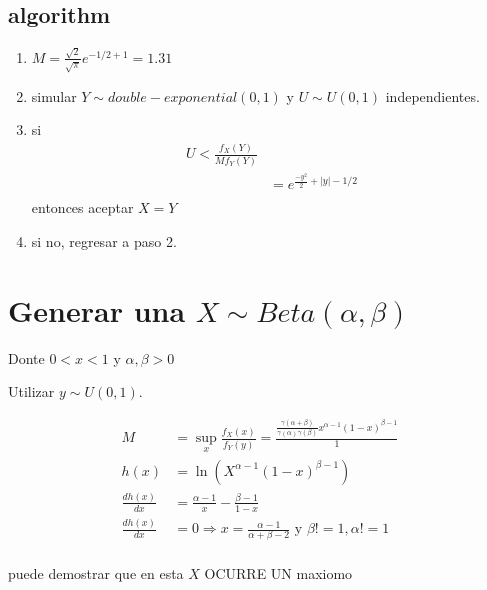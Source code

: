 \documentclass[10pt, oneside]{article}
\begin{document}
\subsection{algorithm}

\begin{enumerate}
	\item $M = \frac{\sqrt{2}}{\sqrt{\pi}} e^{-1/2 + 1} = 1.31$
	\item simular $Y \sim double-exponential(0,1)$ y $U \sim U(0,1)$ independientes.
	\item si
	      \[
		      \begin{split}
			      U < \frac{f_X(Y)}{M f_Y(Y)}         \\
			       & = e^{\frac{-y^2}{2} + |y| - 1/2} \\
		      \end{split}
	      \]
	      entonces aceptar $X = Y$
	\item si no, regresar a paso 2.
\end{enumerate}


\section{Generar una $X \sim Beta(\alpha,\beta)$}

Donte $0 < x < 1$ y $\alpha, \beta > 0$

Utilizar $y \sim U(0,1)$.

\[
	\begin{split}
		M                 & = \sup_x \frac{f_X(x)}{f_Y(y)} = \frac{\frac{\gamma(\alpha + \beta)}{\gamma(\alpha)\gamma(\beta)}x^{\alpha - 1}(1-x)^{\beta-1}}{1} \\
		h(x)              & = \ln{\left( X^{\alpha - 1}(1-x)^{\beta - 1} \right)}                                                                              \\
		\frac{d h(x)}{dx} & = \frac{\alpha - 1}{x} - \frac{\beta - 1}{1-x}                                                                                     \\
		\frac{d h(x)}{dx} & = 0 \Rightarrow x = \frac{\alpha - 1}{\alpha + \beta - 2}  \text{ y } \beta != 1, \alpha != 1                                      \\
	\end{split}
\]

puede demostrar que en esta $X$ OCURRE UN maxiomo
\end{document}
